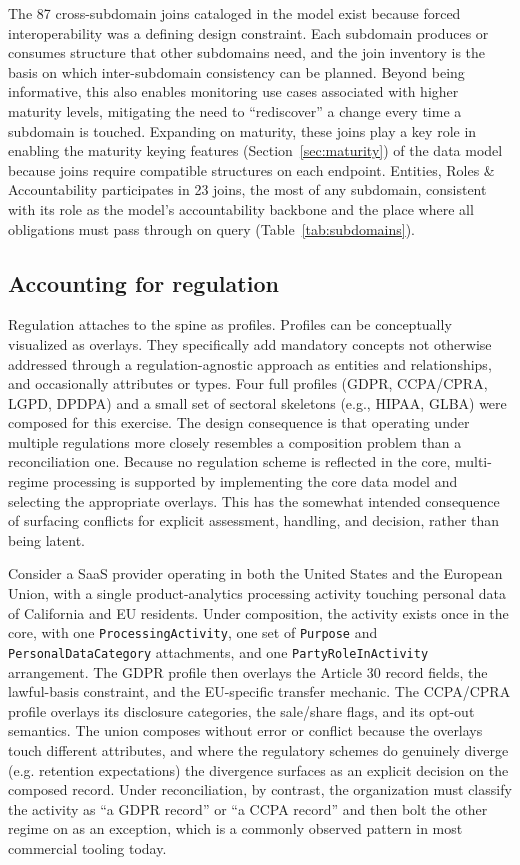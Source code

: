 \documentclass[10pt,letterpaper,twocolumn,twoside]{rho-class/rho}
\begin{document}
The 87 cross-subdomain joins cataloged in the model exist because forced interoperability was a defining design constraint. Each subdomain produces or consumes structure that other subdomains need, and the join inventory is the basis on which inter-subdomain consistency can be planned. Beyond being informative, this also enables monitoring use cases associated with higher maturity levels, mitigating the need to ``rediscover'' a change every time a subdomain is touched. Expanding on maturity, these joins play a key role in enabling the maturity keying features (Section~\ref{sec:maturity}) of the data model because joins require compatible structures on each endpoint. Entities, Roles \& Accountability participates in 23 joins, the most of any subdomain, consistent with its role as the model's accountability backbone and the place where all obligations must pass through on query (Table~\ref{tab:subdomains}).

\subsection{Accounting for regulation}\label{sec:regulation}

Regulation attaches to the spine as profiles. Profiles can be conceptually visualized as overlays. They specifically add mandatory concepts not otherwise addressed through a regulation-agnostic approach as entities and relationships, and occasionally attributes or types. Four full profiles (GDPR, CCPA/CPRA, LGPD, DPDPA) and a small set of sectoral skeletons (e.g., HIPAA, GLBA) were composed for this exercise. The design consequence is that operating under multiple regulations more closely resembles a composition problem than a reconciliation one. Because no regulation scheme is reflected in the core, multi-regime processing is supported by implementing the core data model and selecting the appropriate overlays. This has the somewhat intended consequence of surfacing conflicts for explicit assessment, handling, and decision, rather than being latent.

Consider a SaaS provider operating in both the United States and the European Union, with a single product-analytics processing activity touching personal data of California and EU residents. Under composition, the activity exists once in the core, with one \texttt{ProcessingActivity}, one set of \texttt{Purpose} and \texttt{PersonalDataCategory} attachments, and one \texttt{PartyRoleInActivity} arrangement. The GDPR profile then overlays the Article 30 record fields, the lawful-basis constraint, and the EU-specific transfer mechanic. The CCPA/CPRA profile overlays its disclosure categories, the sale/share flags, and its opt-out semantics. The union composes without error or conflict because the overlays touch different attributes, and where the regulatory schemes do genuinely diverge (e.g. retention expectations) the divergence surfaces as an explicit decision on the composed record. Under reconciliation, by contrast, the organization must classify the activity as ``a GDPR record'' or ``a CCPA record'' and then bolt the other regime on as an exception, which is a commonly observed pattern in most commercial tooling today.
\end{document}

